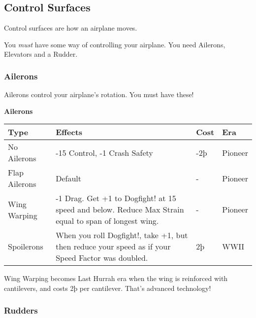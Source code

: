 \documentclass{article}
\begin{document}
\subsection{Control Surfaces}
\label{_Control_Surfaces}

Control surfaces are how an airplane moves.

You \emph{must }have some way of controlling your airplane. You need
Ailerons, Elevators and a Rudder.

\subsubsection{Ailerons}
\label{_Ailerons}

Ailerons control your airplane's rotation. You must have these!

\textbf{Ailerons}

\begin{tabular}{|l|l|l|l|}
    \hline
    Type                                             & Effects                                                & Cost    & Era     \\\hline
    No Ailerons                                      & -15 Control, -1 Crash Safety                           & -2þ     & Pioneer \\\hline
    Flap Ailerons                                    & Default                                                & -       & Pioneer \\\hline
    Wing Warping                                     & -1 Drag. Get +1 to Dogfight! at 15 speed and below.
    Reduce Max Strain equal to span of longest wing. & -                                                      & Pioneer           \\\hline
    Spoilerons                                       & When you roll Dogfight!, take +1, but then reduce your
    speed as if your Speed Factor was doubled.       & 2þ                                                     & WWII              \\\hline
\end{tabular}

Wing Warping becomes Last Hurrah era when the wing is reinforced
with cantilevers, and costs 2þ per cantilever. That's advanced
technology!

\subsubsection{Rudders}
\label{_Rudders}
\end{document}
